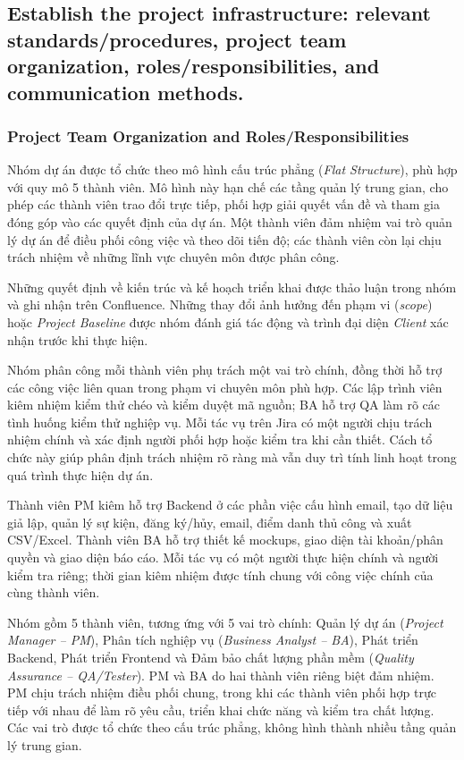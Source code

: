 \subsection{Establish the project infrastructure: relevant standards/procedures, project team organization, roles/responsibilities, and communication methods.}

\subsubsection{Project Team Organization and Roles/Responsibilities}


Nhóm dự án được tổ chức theo mô hình cấu trúc phẳng (\textit{Flat Structure}), phù hợp với quy mô 5 thành viên. Mô hình này hạn chế các tầng quản lý trung gian, cho phép các thành viên trao đổi trực tiếp, phối hợp giải quyết vấn đề và tham gia đóng góp vào các quyết định của dự án. Một thành viên đảm nhiệm vai trò quản lý dự án để điều phối công việc và theo dõi tiến độ; các thành viên còn lại chịu trách nhiệm về những lĩnh vực chuyên môn được phân công.

Những quyết định về kiến trúc và kế hoạch triển khai được thảo luận trong nhóm và ghi nhận trên Confluence. Những thay đổi ảnh hưởng đến phạm vi (\textit{scope}) hoặc \textit{Project Baseline} được nhóm đánh giá tác động và trình đại diện \textit{Client} xác nhận trước khi thực hiện.

Nhóm phân công mỗi thành viên phụ trách một vai trò chính, đồng thời hỗ trợ các công việc liên quan trong phạm vi chuyên môn phù hợp. Các lập trình viên kiêm nhiệm kiểm thử chéo và kiểm duyệt mã nguồn; BA hỗ trợ QA làm rõ các tình huống kiểm thử nghiệp vụ. Mỗi tác vụ trên Jira có một người chịu trách nhiệm chính và xác định người phối hợp hoặc kiểm tra khi cần thiết. Cách tổ chức này giúp phân định trách nhiệm rõ ràng mà vẫn duy trì tính linh hoạt trong quá trình thực hiện dự án.

Thành viên PM kiêm hỗ trợ Backend ở các phần việc cấu hình email, tạo dữ liệu giả lập, quản lý sự kiện, đăng ký/hủy, email, điểm danh thủ công và xuất CSV/Excel. Thành viên BA hỗ trợ thiết kế mockups, giao diện tài khoản/phân quyền và giao diện báo cáo. Mỗi tác vụ có một người thực hiện chính và người kiểm tra riêng; thời gian kiêm nhiệm được tính chung với công việc chính của cùng thành viên.


Nhóm gồm 5 thành viên, tương ứng với 5 vai trò chính: Quản lý dự án (\textit{Project Manager -- PM}), Phân tích nghiệp vụ (\textit{Business Analyst -- BA}), Phát triển Backend, Phát triển Frontend và Đảm bảo chất lượng phần mềm (\textit{Quality Assurance -- QA/Tester}). PM và BA do hai thành viên riêng biệt đảm nhiệm. PM chịu trách nhiệm điều phối chung, trong khi các thành viên phối hợp trực tiếp với nhau để làm rõ yêu cầu, triển khai chức năng và kiểm tra chất lượng. Các vai trò được tổ chức theo cấu trúc phẳng, không hình thành nhiều tầng quản lý trung gian.

